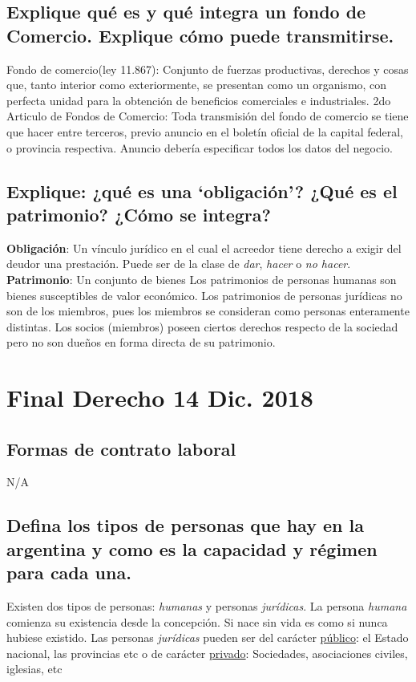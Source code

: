 \documentclass{article}
\begin{document}
\subsection{Explique qué es y qué integra un fondo de Comercio. Explique cómo puede transmitirse.} \label{sec:QueEsUnFondoDeComercioYTransmision}
Fondo de comercio(ley 11.867): Conjunto de fuerzas productivas, derechos y cosas que, tanto interior como exteriormente, se presentan como un organismo, con perfecta unidad para la obtención de beneficios comerciales e industriales. 
2do Articulo de Fondos de Comercio: Toda transmisión del fondo de comercio se tiene que hacer entre terceros, previo anuncio en el boletín oficial de la capital federal, o provincia respectiva. Anuncio debería especificar todos los datos del negocio.

\subsection{Explique: ¿qué es una ‘obligación’? ¿Qué es el patrimonio? ¿Cómo se integra?}
\textbf{Obligación}: Un vínculo jurídico en el cual el acreedor tiene derecho a exigir del deudor una prestación. Puede ser de la clase de \textit{dar}, \textit{hacer} o \textit{no hacer}. 
\textbf{Patrimonio}: Un conjunto de bienes
Los patrimonios de personas humanas son bienes susceptibles de valor económico.
Los patrimonios de personas jurídicas no son de los miembros, pues los miembros se consideran como personas enteramente distintas. Los socios (miembros) poseen ciertos derechos respecto de la sociedad pero no son dueños en forma directa de su patrimonio.


\section{Final Derecho 14 Dic. 2018}
\subsection{Formas de contrato laboral}
N/A
\subsection{Defina los tipos de personas que hay en la argentina y como es la capacidad y régimen para cada una.}
Existen dos tipos de personas: \textit{humanas} y personas \textit{jurídicas}. La persona \textit{humana} comienza su existencia desde la concepción. Si nace sin vida es como si nunca hubiese existido. Las personas \textit{jurídicas} pueden ser del carácter \underline{público}: el Estado nacional, las provincias etc o de carácter \underline{privado}: Sociedades, asociaciones civiles, iglesias, etc
\end{document}
